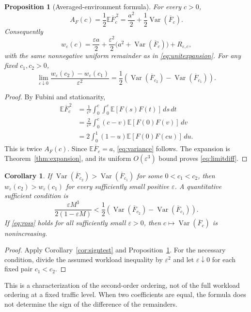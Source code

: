 \documentclass[11pt,reqno]{amsart}
\numberwithin{equation}{section}
\theoremstyle{plain}
\newtheorem{proposition}[theorem]{Proposition}
\newtheorem{corollary}[theorem]{Corollary}
\theoremstyle{definition}
\newcommand{\E}{\mathbb E}
\newcommand{\1}{\mathbf 1}
\newcommand{\eps}{\varepsilon}
\DeclareMathOperator{\Var}{Var}
\begin{document}
\begin{proposition}[Averaged-environment formula]\label{prop:variance}
For every $c>0$,
\begin{equation}\label{eq:variance}
 A_F(c)=\frac12\E\overline F_c^{\,2}
       =\frac{a^2}{2}+\frac12\Var(\overline F_c).
\end{equation}
Consequently
\begin{equation}\label{eq:varianceexpansion}
 w_\eps(c)=\frac{\eps a}{2}
 +\frac{\eps^2}{2}\bigl(a^2+\Var(\overline F_c)\bigr)+R_{\eps,c},
\end{equation}
with the same nonnegative uniform remainder as in \eqref{eq:unitexpansion}. For any fixed $c_1,c_2>0$,
\begin{equation}\label{eq:limitdiff}
 \lim_{\eps\downarrow0}
 \frac{w_\eps(c_2)-w_\eps(c_1)}{\eps^2}
 =\frac12\left(\Var(\overline F_{c_2})-\Var(\overline F_{c_1})\right).
\end{equation}
\end{proposition}
\begin{proof}
By Fubini and stationarity,
\begin{align*}
 \E\overline F_c^{\,2}
 &=\frac1{c^2}\int_0^c\int_0^c\E[F(s)F(t)]\,ds\,dt\\
 &=\frac2{c^2}\int_0^c(c-v)\E[F(0)F(v)]\,dv\\
 &=2\int_0^1(1-u)\E[F(0)F(cu)]\,du.
\end{align*}
This is twice $A_F(c)$. Since $\E\overline F_c=a$, \eqref{eq:variance} follows. The expansion is Theorem~\ref{thm:expansion}, and its uniform $O(\eps^3)$ bound proves \eqref{eq:limitdiff}.
\end{proof}

\begin{corollary}\label{cor:variancecriterion}
If $\Var(\overline F_{c_2})>\Var(\overline F_{c_1})$ for some $0<c_1<c_2$, then $w_\eps(c_2)>w_\eps(c_1)$ for every sufficiently small positive $\eps$. A quantitative sufficient condition is
\begin{equation}\label{eq:varianceeps}
 \frac{\eps M^3}{2(1-\eps M)}
 <\frac12\left(\Var(\overline F_{c_2})-\Var(\overline F_{c_1})\right).
\end{equation}
If \eqref{eq:ross} holds for all sufficiently small $\eps>0$, then $c\mapsto\Var(\overline F_c)$ is nonincreasing.
\end{corollary}
\begin{proof}
Apply Corollary~\ref{cor:signtest} and Proposition~\ref{prop:variance}. For the necessary condition, divide the assumed workload inequality by $\eps^2$ and let $\eps\downarrow0$ for each fixed pair $c_1<c_2$.
\end{proof}
This is a characterization of the second-order ordering, not of the full workload ordering at a fixed traffic level. When two coefficients are equal, the formula does not determine the sign of the difference of the remainders.
\end{document}
